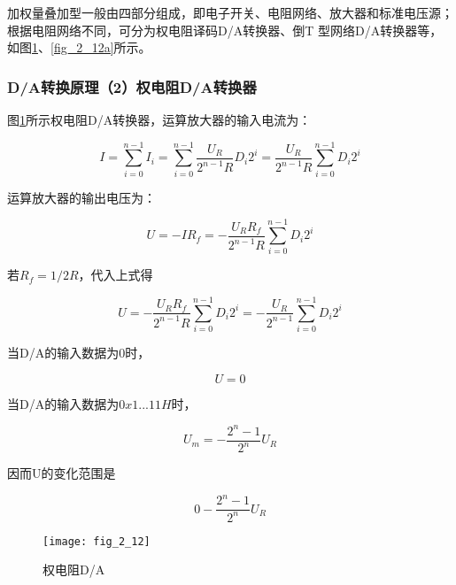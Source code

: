 加权量叠加型一般由四部分组成，即电子开关、电阻网络、放大器和标准电压源；根据电阻网络不同，可分为权电阻译码D/A转换器、倒T 型网络D/A转换器等，如图\ref{fig_2_12}、\ref{fig_2_12a}所示。



\subsubsection{D/A转换原理（2）权电阻D/A转换器}





图\ref{fig_2_12}所示权电阻D/A转换器，运算放大器的输入电流为：





\begin{equation}
  I = \sum_{i=0}^{n-1}I_i = \sum_{i=0}^{n-1} \frac{U_R}{2^{n-1}R}D_i2^i = \frac{U_R}{2^{n-1}R}\sum_{i=0}^{n-1} D_i2^i
\end{equation}


运算放大器的输出电压为：


\begin{equation}
  U=-IR_f  =-\frac{U_RR_f}{2^{n-1}R}\sum_{i=0}^{n-1} D_i2^i
\end{equation}

若$R_f = 1/2R$，代入上式得

\begin{equation}
  U=- \frac{U_RR_f}{2^{n-1}R}\sum_{i=0}^{n-1} D_i2^i = -\frac{U_R}{2^{n-1}}\sum_{i=0}^{n-1} D_i2^i
\end{equation}


当D/A的输入数据为0时，

\begin{equation}
  U=0
\end{equation}

当D/A的输入数据为$0x1...11H$时，

\begin{equation}
  U_m=-\frac{2^n-1}{2^n}U_R
\end{equation}

因而U的变化范围是

\begin{equation}
  0-\frac{2^n-1}{2^n}U_R
\end{equation}

\begin{figure}
  \centering
  \texttt{[image: fig\_2\_12]}
  \caption{权电阻D/A}\label{fig_2_12}
\end{figure}


